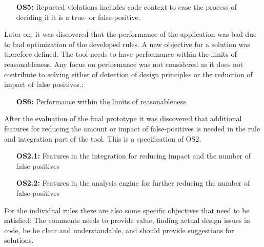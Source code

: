 \documentclass{report}
\begin{document}
\begin{itemize}
        \item [\textbf{OS5:}] Reported violations includes code context to ease the process of deciding if it is a true- or false-positive. 
\end{itemize}

Later on, it was discovered that the performance of the application was bad due to bad optimization of the developed rules. A new objective for a solution was therefore defined. The tool needs to have performance within the limits of reasonableness. Any focus on performance was not considered as it does not contribute to solving either of detection of design principles or the reduction of impact of false positives.:
\begin{itemize}
    \item [\textbf{OS6:}] Performance within the limits of reasonableness
\end{itemize}

After the evaluation of the final prototype it was discovered that additional features for reducing the amount or impact of false-positives is needed in the rule and integration part of the tool. This is a specification of OS2. 
\begin{itemize}
    \item [\textbf{OS2.1:}] Features in the integration for reducing impact and the number of false-positives
    \item [\textbf{OS2.2:}] Features in the analysis engine for further reducing the number of false-positives  
\end{itemize}






For the individual rules there are also some specific objectives that need to be satisfied: The comments needs to provide value, finding actual design issues in code, be be clear and understandable, and should provide suggestions for solutions.
\end{document}
